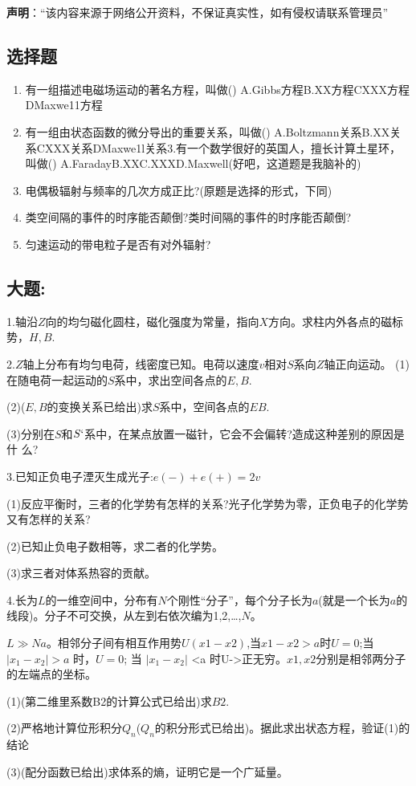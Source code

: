 
\textbf{声明}：“该内容来源于网络公开资料，不保证真实性，如有侵权请联系管理员”

\subsection{选择题}
\begin{enumerate}
\item 有一组描述电磁场运动的著名方程，叫做()
A.Gibbs方程B.XX方程CXXX方程DMaxwe11方程
\item 有一组由状态函数的微分导出的重要关系，叫做()
A.Boltzmann关系B.XX关系CXXX关系DMaxwe1l关系3.有一个数学很好的英国人，擅长计算土星环，叫做()
A.FaradayB.XXC.XXXD.Maxwell(好吧，这道题是我脑补的)
\item 电偶极辐射与频率的几次方成正比?(原题是选择的形式，下同)
\item 类空间隔的事件的时序能否颠倒?类时间隔的事件的时序能否颠倒?
\item 匀速运动的带电粒子是否有对外辐射?
\end{enumerate}
\subsection{大题:}

1.轴沿$Z$向的均匀磁化圆柱，磁化强度为常量，指向$X$方向。求柱内外各点的磁标势，$H,B$.

2.$Z$轴上分布有均匀电荷，线密度已知。电荷以速度$v$相对$S$系向$Z$轴正向运动。
(1)在随电荷一起运动的$S$系中，求出空间各点的$E,B$.

(2)($E,B$的变换关系已给出)求$S$系中，空间各点的$EB$.

(3)分别在$S$和$S`$系中，在某点放置一磁针，它会不会偏转?造成这种差别的原因是什
么?

3.已知正负电子湮灭生成光子:$e(-)+e(+)=2v$

(1)反应平衡时，三者的化学势有怎样的关系?光子化学势为零，正负电子的化学势又有怎样的关系?

(2)已知止负电子数相等，求二者的化学势。

(3)求三者对体系热容的贡献。

4.长为$L$的一维空间中，分布有$N$个刚性“分子”，每个分子长为$a$(就是一个长为$a$的线段)。分子不可交换，从左到右依次编为1,2,…,$N$。

$L\gg Na$。相邻分子间有相互作用势$U(x1-x2)$,当$x1-x2>a$时$U=0$;当 $\left| x_1 - x_2 \right| > a$ 时，$U = 0$; 当 $\left| x_1 - x_2 \right|$ <a 时U->正无穷。$x1,x2$分别是相邻两分子的左端点的坐标。

(1)(第二维里系数B2的计算公式已给出)求$B2$.

(2)严格地计算位形积分$Q_n$($Q_n$的积分形式已给出)。据此求出状态方程，验证(1)的结论

(3)(配分函数已给出)求体系的熵，证明它是一个广延量。

